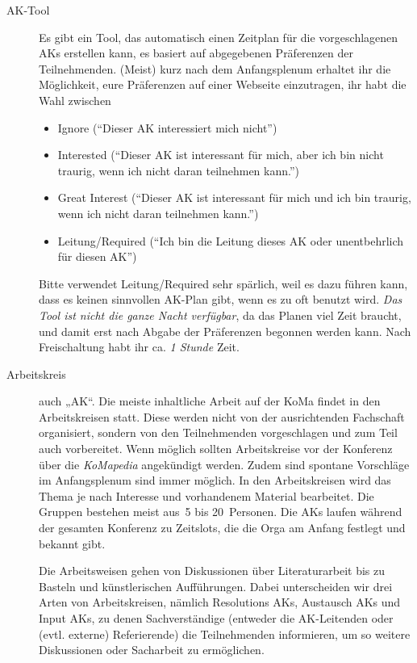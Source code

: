 \begin{description}
\item[AK-Tool]
    Es gibt ein Tool, das automatisch einen Zeitplan für die vorgeschlagenen AKs erstellen kann, es basiert auf abgegebenen Präferenzen der Teilnehmenden. (Meist) kurz nach dem Anfangsplenum erhaltet ihr die Möglichkeit, eure Präferenzen auf einer Webseite einzutragen, ihr habt die Wahl zwischen
    \begin{itemize}
        \item Ignore (\enquote{Dieser AK interessiert mich nicht})
        \item Interested (\enquote{Dieser AK ist interessant für mich, aber ich bin nicht traurig, wenn ich nicht daran teilnehmen kann.})
        \item Great Interest (\enquote{Dieser AK ist interessant für mich und ich bin traurig, wenn ich nicht daran teilnehmen kann.})
        \item Leitung/Required (\enquote{Ich bin die Leitung dieses AK oder unentbehrlich für diesen AK})
    \end{itemize}
    Bitte verwendet Leitung/Required sehr spärlich, weil es dazu führen kann, dass es keinen sinnvollen AK-Plan gibt, wenn es zu oft benutzt wird.
    \emph{Das Tool ist nicht die ganze Nacht verfügbar}, da das Planen viel Zeit braucht, und damit erst nach Abgabe der Präferenzen begonnen werden kann. Nach Freischaltung habt ihr ca. \emph{1 Stunde} Zeit.

\item[Arbeitskreis]
    auch „AK“. Die meiste inhaltliche Arbeit auf der KoMa findet in den Arbeitskreisen statt. Diese werden nicht von der ausrichtenden Fachschaft organisiert, sondern von den Teilnehmenden vorgeschlagen und zum Teil auch vorbereitet. Wenn möglich sollten Arbeitskreise vor der Konferenz über die \emph{KoMapedia} angekündigt werden. Zudem sind spontane Vorschläge im Anfangsplenum sind immer möglich. In den Arbeitskreisen wird das Thema je nach Interesse und vorhandenem Material bearbeitet. Die Gruppen bestehen meist aus~5 bis 20~Personen. Die AKs laufen während der gesamten Konferenz zu Zeitslots, die die Orga am Anfang festlegt und bekannt gibt.
	
	Die Arbeitsweisen gehen	von Diskussionen über Literaturarbeit bis zu Basteln und künstlerischen Aufführungen. Dabei unterscheiden wir drei Arten von Arbeitskreisen, nämlich Resolutions AKs, Austausch AKs und Input AKs, zu denen Sachverständige (entweder die AK-Leitenden oder (evtl. externe) Referierende) die Teilnehmenden informieren, um so weitere Diskussionen oder Sacharbeit zu ermöglichen.


\end{description}
